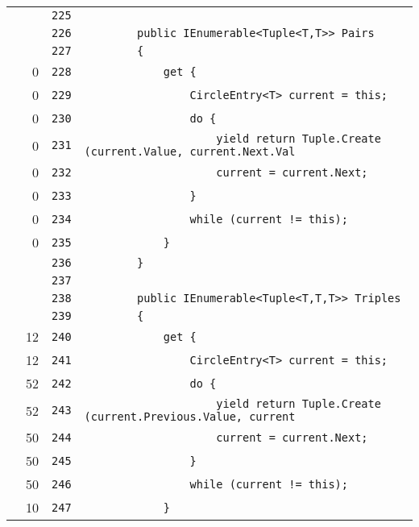 \documentclass[a4paper,10pt]{article}
\begin{document}
\begin{longtable}[l]{lrrl}
\cellcolor{gray} &  & \verb~225~ & \verb~~\\
\cellcolor{gray} &  & \verb~226~ & \verb~        public IEnumerable<Tuple<T,T>> Pairs~\\
\cellcolor{gray} &  & \verb~227~ & \verb~        {~\\
\cellcolor{red} & 0 & \verb~228~ & \verb~            get {~\\
\cellcolor{red} & 0 & \verb~229~ & \verb~                CircleEntry<T> current = this;~\\
\cellcolor{red} & 0 & \verb~230~ & \verb~                do {~\\
\cellcolor{red} & 0 & \verb~231~ & \verb~                    yield return Tuple.Create (current.Value, current.Next.Val~\\
\cellcolor{red} & 0 & \verb~232~ & \verb~                    current = current.Next;~\\
\cellcolor{red} & 0 & \verb~233~ & \verb~                }~\\
\cellcolor{red} & 0 & \verb~234~ & \verb~                while (current != this);~\\
\cellcolor{red} & 0 & \verb~235~ & \verb~            }~\\
\cellcolor{gray} &  & \verb~236~ & \verb~        }~\\
\cellcolor{gray} &  & \verb~237~ & \verb~~\\
\cellcolor{gray} &  & \verb~238~ & \verb~        public IEnumerable<Tuple<T,T,T>> Triples~\\
\cellcolor{gray} &  & \verb~239~ & \verb~        {~\\
\cellcolor{green} & 12 & \verb~240~ & \verb~            get {~\\
\cellcolor{green} & 12 & \verb~241~ & \verb~                CircleEntry<T> current = this;~\\
\cellcolor{green} & 52 & \verb~242~ & \verb~                do {~\\
\cellcolor{green} & 52 & \verb~243~ & \verb~                    yield return Tuple.Create (current.Previous.Value, current~\\
\cellcolor{green} & 50 & \verb~244~ & \verb~                    current = current.Next;~\\
\cellcolor{green} & 50 & \verb~245~ & \verb~                }~\\
\cellcolor{green} & 50 & \verb~246~ & \verb~                while (current != this);~\\
\cellcolor{green} & 10 & \verb~247~ & \verb~            }~\\

\end{longtable}
\end{document}
